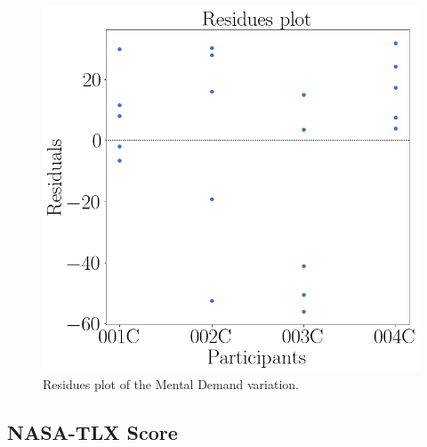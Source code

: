 \begin{figure}[!htb]
\begin{minipage}{0.45\linewidth}
                \includegraphics[width = \linewidth]{Resultados/Nasa/Figuras/png/residplot_md_var.png}
                \caption{Residues plot of the Mental Demand variation.}
                \label{fig:residual_bom_average}
            \end{minipage}
        \end{figure}

\FloatBarrier

\subsection{NASA-TLX Score}

